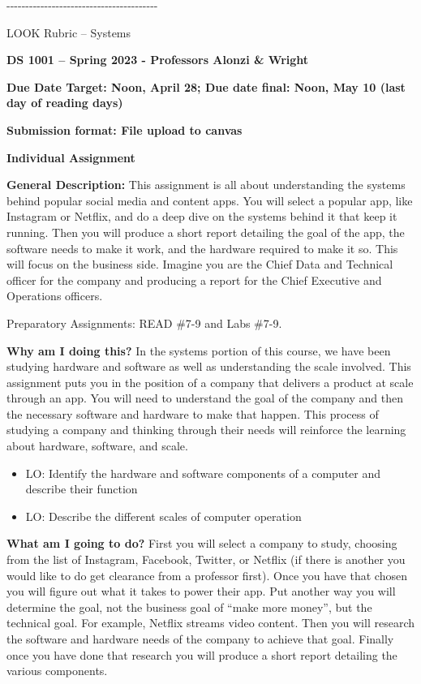 \documentclass[
  letterpaper,
  DIV=11,
  numbers=noendperiod]{scrreprt}
\begin{document}
-\/-\/-\/-\/-\/-\/-\/-\/-\/-\/-\/-\/-\/-\/-\/-\/-\/-\/-\/-\/-\/-\/-\/-\/-\/-\/-\/-\/-\/-\/-\/-\/-\/-\/-\/-\/-\/-\/-\/-

LOOK Rubric -- Systems

\textbf{DS 1001 -- Spring 2023 - Professors Alonzi \& Wright}

\textbf{Due Date Target: Noon, April 28; Due date final: Noon, May 10
(last day of reading days)}

\textbf{Submission format: File upload to canvas}

\textbf{Individual Assignment}

\textbf{General Description:} This assignment is all about understanding
the systems behind popular social media and content apps. You will
select a popular app, like Instagram or Netflix, and do a deep dive on
the systems behind it that keep it running. Then you will produce a
short report detailing the goal of the app, the software needs to make
it work, and the hardware required to make it so. This will focus on the
business side. Imagine you are the Chief Data and Technical officer for
the company and producing a report for the Chief Executive and
Operations officers.

Preparatory Assignments: READ \#7-9 and Labs \#7-9.

\textbf{Why am I doing this?} In the systems portion of this course, we
have been studying hardware and software as well as understanding the
scale involved. This assignment puts you in the position of a company
that delivers a product at scale through an app. You will need to
understand the goal of the company and then the necessary software and
hardware to make that happen. This process of studying a company and
thinking through their needs will reinforce the learning about hardware,
software, and scale.

\begin{itemize}
\item
  LO: Identify the hardware and software components of a computer and
  describe their function
\item
  LO: Describe the different scales of computer operation
\end{itemize}

\textbf{What am I going to do?} First you will select a company to
study, choosing from the list of Instagram, Facebook, Twitter, or
Netflix (if there is another you would like to do get clearance from a
professor first). Once you have that chosen you will figure out what it
takes to power their app. Put another way you will determine the goal,
not the business goal of ``make more money'', but the technical goal.
For example, Netflix streams video content. Then you will research the
software and hardware needs of the company to achieve that goal. Finally
once you have done that research you will produce a short report
detailing the various components.
\end{document}
